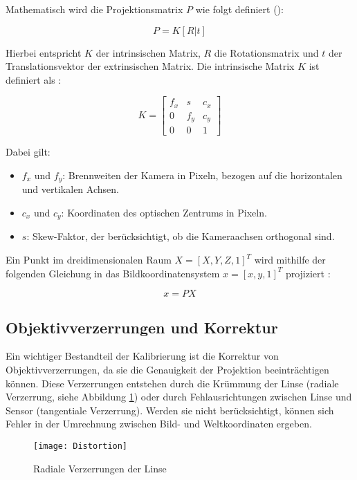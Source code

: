 Mathematisch wird die Projektionsmatrix \(P\) wie folgt definiert (\cite{mw2024calibration, szeliski2022computerVision}):

\[
P = K[R|t]
\]

Hierbei entspricht \(K\) der intrinsischen Matrix, \(R\) die Rotationsmatrix und \(t\) der Translationsvektor der extrinsischen Matrix. Die intrinsische Matrix \(K\) ist definiert als \cite{mw2024calibration}:

\[
K = 
\begin{bmatrix}
f_x & s & c_x \\
0 & f_y & c_y \\
0 & 0 & 1
\end{bmatrix}
\]

Dabei gilt:

\begin{itemize}
    \item \( f_x \) und \( f_y \): Brennweiten der Kamera in Pixeln, bezogen auf die horizontalen und vertikalen Achsen.
    \item \( c_x \) und \( c_y \): Koordinaten des optischen Zentrums in Pixeln.
    \item \( s \): Skew-Faktor, der berücksichtigt, ob die Kameraachsen orthogonal sind.
\end{itemize}

Ein Punkt im dreidimensionalen Raum \( X = [X, Y, Z, 1]^T \) wird mithilfe der folgenden Gleichung in das Bildkoordinatensystem \( x = [x, y, 1]^T \) projiziert \cite{mw2024calibration}:

\[
x = PX
\]

\subsection{Objektivverzerrungen und Korrektur}

Ein wichtiger Bestandteil der Kalibrierung ist die Korrektur von Objektivverzerrungen, da sie die Genauigkeit der Projektion beeinträchtigen können. Diese Verzerrungen entstehen durch die Krümmung der Linse (radiale Verzerrung, siehe Abbildung \ref{fig:Distortion}) oder durch Fehlausrichtungen zwischen Linse und Sensor (tangentiale Verzerrung). Werden sie nicht berücksichtigt, können sich Fehler in der Umrechnung zwischen Bild- und Weltkoordinaten ergeben. \cite{mw2024calibration, szeliski2022computerVision}

\begin{figure}
    \centering
    \texttt{[image: Distortion]}
    \caption{Radiale Verzerrungen der Linse \cite{stachniss2021calibration}\label{fig:Distortion}}
\end{figure}

